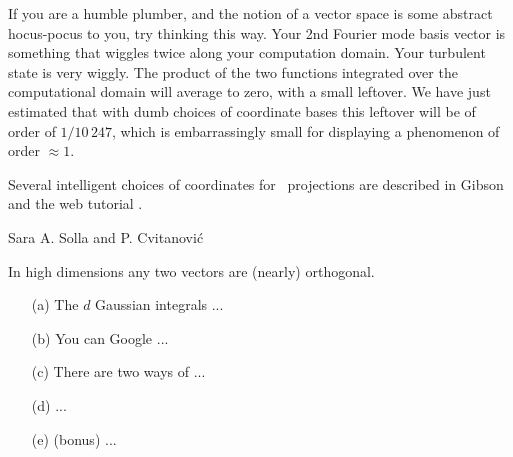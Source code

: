 {If you are a humble plumber, and the notion of a vector space is some
abstract hocus-pocus to you, try thinking this way. Your 2nd Fourier mode
basis vector is something that wiggles twice along your computation
domain. Your turbulent state is very wiggly. The product of the two
functions integrated over the computational domain will average to zero,
with a small leftover. We have just estimated that with dumb choices of
coordinate bases this leftover will be of order of $1/10\,247$, which is
embarrassingly small for displaying a phenomenon of order $\approx 1$.

Several intelligent choices of coordinates for \statesp\ projections are
described in Gibson \etal{} and the web tutorial
.

\hfill                  Sara A. Solla
                        and P. Cvitanovi\'c
} %


{In high dimensions any two vectors are (nearly) orthogonal.}{
\begin{itemize}
  \item [(a)] The $d$ Gaussian integrals ...

  \item [(b)] You can Google ...

  \item [(c)] There are two ways of ...

  \item [(d)] ...

  \item [(e)] (bonus) ...

\end{itemize}
    } %





%



